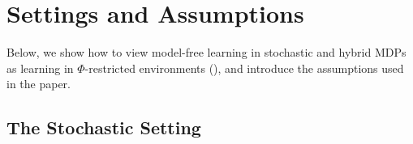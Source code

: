 

\section{Settings and Assumptions}
\label{sec: settings and assumptions}
Below, we show how to view model-free learning in stochastic and hybrid MDPs as learning in $\Phi$-restricted environments (), and introduce the assumptions used in the paper.  

\subsection{The Stochastic Setting}

